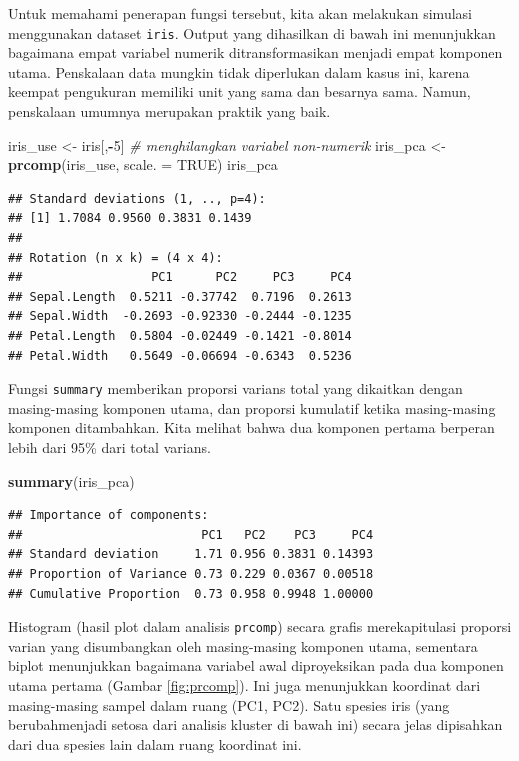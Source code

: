 \documentclass[
]{book}
\newenvironment{Shaded}{\begin{snugshade}}{\end{snugshade}}
\newcommand{\AttributeTok}[1]{\textcolor[rgb]{0.13,0.29,0.53}{#1}}
\newcommand{\CommentTok}[1]{\textcolor[rgb]{0.56,0.35,0.01}{\textit{#1}}}
\newcommand{\ConstantTok}[1]{\textcolor[rgb]{0.56,0.35,0.01}{#1}}
\newcommand{\DecValTok}[1]{\textcolor[rgb]{0.00,0.00,0.81}{#1}}
\newcommand{\FunctionTok}[1]{\textcolor[rgb]{0.13,0.29,0.53}{\textbf{#1}}}
\newcommand{\NormalTok}[1]{#1}
\newcommand{\OtherTok}[1]{\textcolor[rgb]{0.56,0.35,0.01}{#1}}
\newcommand{\SpecialCharTok}[1]{\textcolor[rgb]{0.81,0.36,0.00}{\textbf{#1}}}
\theoremstyle{definition}
\theoremstyle{definition}
\theoremstyle{definition}
\theoremstyle{definition}
\theoremstyle{remark}
\begin{document}
Untuk memahami penerapan fungsi tersebut, kita akan melakukan simulasi menggunakan dataset \texttt{iris}. Output yang dihasilkan di bawah ini menunjukkan bagaimana empat variabel numerik ditransformasikan menjadi empat komponen utama. Penskalaan data mungkin tidak diperlukan dalam kasus ini, karena keempat pengukuran memiliki unit yang sama dan besarnya sama. Namun, penskalaan umumnya merupakan praktik yang baik.

\begin{Shaded}
\begin{Highlighting}[]
\NormalTok{iris\_use }\OtherTok{\textless{}{-}}\NormalTok{ iris[,}\SpecialCharTok{{-}}\DecValTok{5}\NormalTok{] }\CommentTok{\# menghilangkan variabel non{-}numerik}
\NormalTok{iris\_pca }\OtherTok{\textless{}{-}} \FunctionTok{prcomp}\NormalTok{(iris\_use, }\AttributeTok{scale. =} \ConstantTok{TRUE}\NormalTok{)}
\NormalTok{iris\_pca}
\end{Highlighting}
\end{Shaded}

\begin{verbatim}
## Standard deviations (1, .., p=4):
## [1] 1.7084 0.9560 0.3831 0.1439
## 
## Rotation (n x k) = (4 x 4):
##                  PC1      PC2     PC3     PC4
## Sepal.Length  0.5211 -0.37742  0.7196  0.2613
## Sepal.Width  -0.2693 -0.92330 -0.2444 -0.1235
## Petal.Length  0.5804 -0.02449 -0.1421 -0.8014
## Petal.Width   0.5649 -0.06694 -0.6343  0.5236
\end{verbatim}

Fungsi \texttt{summary} memberikan proporsi varians total yang dikaitkan dengan masing-masing komponen utama, dan proporsi kumulatif ketika masing-masing komponen ditambahkan. Kita melihat bahwa dua komponen pertama berperan lebih dari 95\% dari total varians.

\begin{Shaded}
\begin{Highlighting}[]
\FunctionTok{summary}\NormalTok{(iris\_pca)}
\end{Highlighting}
\end{Shaded}

\begin{verbatim}
## Importance of components:
##                         PC1   PC2    PC3     PC4
## Standard deviation     1.71 0.956 0.3831 0.14393
## Proportion of Variance 0.73 0.229 0.0367 0.00518
## Cumulative Proportion  0.73 0.958 0.9948 1.00000
\end{verbatim}

Histogram (hasil plot dalam analisis \texttt{prcomp}) secara grafis merekapitulasi proporsi varian yang disumbangkan oleh masing-masing komponen utama, sementara biplot menunjukkan bagaimana variabel awal diproyeksikan pada dua komponen utama pertama (Gambar \ref{fig:prcomp}). Ini juga menunjukkan koordinat dari masing-masing sampel dalam ruang (PC1, PC2). Satu spesies iris (yang berubahmenjadi setosa dari analisis kluster di bawah ini) secara jelas dipisahkan dari dua spesies lain dalam ruang koordinat ini.
\end{document}
